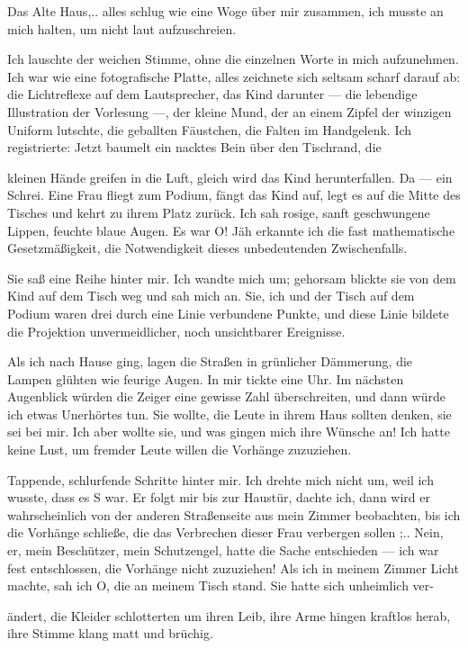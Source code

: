 Das Alte Haus,.. alles schlug wie eine Woge über mir zusammen, ich
musste an mich halten, um nicht laut aufzuschreien.

Ich lauschte der weichen Stimme, ohne die einzelnen Worte in mich
aufzunehmen. Ich war wie eine fotografische Platte, alles zeichnete
sich seltsam scharf darauf ab: die Lichtreflexe auf dem
Lautsprecher, das Kind darunter — die lebendige Illustration der
Vorlesung —, der kleine Mund, der an einem Zipfel der winzigen
Uniform lutschte, die geballten Fäustchen, die Falten im
Handgelenk. Ich registrierte: Jetzt baumelt ein nacktes Bein über
den Tischrand, die

kleinen Hände greifen in die Luft, gleich wird das Kind
herunterfallen. Da — ein Schrei. Eine Frau fliegt zum Podium, fängt
das Kind auf, legt es auf die Mitte des Tisches und kehrt zu ihrem
Platz zurück. Ich sah rosige, sanft geschwungene Lippen, feuchte
blaue Augen. Es war O! Jäh erkannte ich die fast mathematische
Gesetzmäßigkeit, die Notwendigkeit dieses unbedeutenden
Zwischenfalls.

Sie saß eine Reihe hinter mir. Ich wandte mich um; gehorsam blickte
sie von dem Kind auf dem Tisch weg und sah mich an. Sie, ich und
der Tisch auf dem Podium waren drei durch eine Linie verbundene
Punkte, und diese Linie bildete die Projektion unvermeidlicher,
noch unsichtbarer Ereignisse.

Als ich nach Hause ging, lagen die Straßen in grünlicher Dämmerung,
die Lampen glühten wie feurige Augen. In mir tickte eine Uhr. Im
nächsten Augenblick würden die Zeiger eine gewisse Zahl
überschreiten, und dann würde ich etwas Unerhörtes tun. Sie wollte,
die Leute in ihrem Haus sollten denken, sie sei bei mir. Ich aber
wollte sie, und was gingen mich ihre Wünsche an! Ich hatte keine
Lust, um fremder Leute willen die Vorhänge zuzuziehen.

Tappende, schlurfende Schritte hinter mir. Ich drehte mich nicht
um, weil ich wusste, dass es S war. Er folgt mir bis zur Haustür,
dachte ich, dann wird er wahrscheinlich von der anderen
Straßenseite aus mein Zimmer beobachten, bis ich die Vorhänge
schließe, die das Verbrechen dieser Frau verbergen sollen ;.. Nein,
er, mein Beschützer, mein Schutzengel, hatte die Sache entschieden
— ich war fest entschlossen, die Vorhänge nicht zuzuziehen! Als ich
in meinem Zimmer Licht machte, sah ich O, die an meinem Tisch
stand. Sie hatte sich unheimlich ver-

ändert, die Kleider schlotterten um ihren Leib, ihre Arme hingen
kraftlos herab, ihre Stimme klang matt und brüchig.

